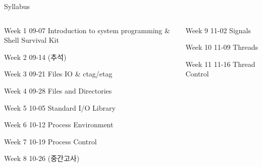 \documentclass[newPxFont,sthlmFooter,nooffset]{beamer}
\begin{document}
\begin{frame}[t]{Syllabus}
\begin{columns}\small
\begin{column}{.48\linewidth}
\hangindent=1cm
Week 1 09-07 Introduction to system programming \& Shell Survival Kit

Week 2 09-14 (추석)

\hangindent=1cm
Week 3 09-21 Files IO \& ctag/etag

\hangindent=1cm
Week 4 09-28 Files and Directories 

\hangindent=1cm
Week 5 10-05 Standard I/O Library

\hangindent=1cm
Week 6 10-12 Process Environment

Week 7 10-19 Process Control

Week 8 10-26 (중간고사)
\end{column}

\begin{column}{.48\linewidth}
Week 9 11-02 Signals

Week 10 11-09 Threads

Week 11 11-16 Thread Control


\end{column}
\end{columns}
\end{frame}
\end{document}
